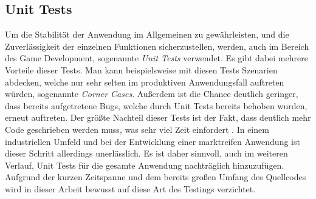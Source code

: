 \subsection{Unit Tests}
Um die Stabilität der Anwendung im Allgemeinen zu gewährleisten, und die Zuverlässigkeit der einzelnen Funktionen sicherzustellen, werden, auch im Bereich des Game Development, sogenannte \textit{Unit Tests} verwendet. Es gibt dabei mehrere Vorteile dieser Tests. Man kann beispielsweise mit diesen Tests Szenarien abdecken, welche nur sehr selten im produktiven Anwendungsfall auftreten würden, sogenannte \textit{Corner Cases}. Außerdem ist die Chance deutlich geringer, dass bereits aufgetretene Bugs, welche durch Unit Tests bereits behoben wurden, erneut auftreten. Der größte Nachteil dieser Tests ist der Fakt, dass deutlich mehr Code geschrieben werden muss, was sehr viel Zeit einfordert \cite*[]{unittests}. In einem industriellen Umfeld und bei der Entwicklung einer marktreifen Anwendung ist dieser Schritt allerdings unerlässlich. Es ist daher sinnvoll, auch im weiteren Verlauf, Unit Tests für die gesamte Anwendung nachträglich hinzuzufügen. Aufgrund der kurzen Zeitspanne und dem bereits großen Umfang des Quellcodes wird in dieser Arbeit bewusst auf diese Art des Testings verzichtet.